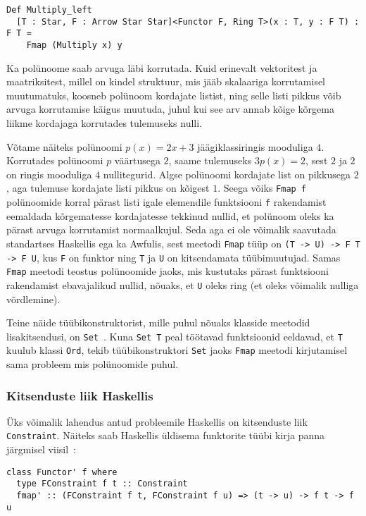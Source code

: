 \documentclass[12pt]{article}
\begin{document}
      \begin{verbatim}Def Multiply_left
  [T : Star, F : Arrow Star Star]<Functor F, Ring T>(x : T, y : F T) : F T =
    Fmap (Multiply x) y\end{verbatim}

      Ka polünoome saab arvuga läbi korrutada. Kuid erinevalt vektoritest ja maatriksitest, millel on kindel struktuur, mis jääb skalaariga korrutamisel muutumatuks, koosneb polünoom kordajate listist, ning selle listi pikkus võib arvuga korrutamise käigus muutuda, juhul kui see arv annab kõige kõrgema liikme kordajaga korrutades tulemuseks nulli.

      Võtame näiteks polünoomi $p(x)=2x+3$ jäägiklassiringis mooduliga $4$. Korrutades polünoomi $p$ väärtusega $2$, saame tulemuseks $3p(x)=2$, sest $2$ ja $2$ on ringis mooduliga $4$ nullitegurid. Algse polünoomi kordajate list on pikkusega $2$, aga tulemuse kordajate listi pikkus on kõigest $1$. Seega võiks \verb!Fmap f! polünoomide korral pärast listi igale elemendile funktsiooni \verb!f! rakendamist eemaldada kõrgematesse kordajatesse tekkinud nullid, et polünoom oleks ka pärast arvuga korrutamist normaalkujul. Seda aga ei ole võimalik saavutada standartses Haskellis ega ka Awfulis, sest meetodi \verb!Fmap! tüüp on \verb!(T -> U) -> F T -> F U!, kus \verb!F! on funktor ning \verb!T! ja \verb!U! on kitsendamata tüübimuutujad. Samas \verb!Fmap! meetodi teostus polünoomide jaoks, mis kustutaks pärast funktsiooni rakendamist ebavajalikud nullid, nõuaks, et \verb!U! oleks ring (et oleks võimalik nulliga võrdlemine).

      Teine näide tüübikonstruktorist, mille puhul nõuaks klasside meetodid lisakitsendusi, on \verb!Set!~\cite{Cat}. Kuna \verb!Set T! peal töötavad funktsioonid eeldavad, et \verb!T! kuulub klassi \verb!Ord!, tekib tüübikonstruktori \verb!Set! jaoks \verb!Fmap! meetodi kirjutamisel sama probleem mis polünoomide puhul.
      \subsubsection{Kitsenduste liik Haskellis}
        Üks võimalik lahendus antud probleemile Haskellis on kitsenduste liik \verb!Constraint!. Näiteks saab Haskellis üldisema funktorite tüübi kirja panna järgmisel viisil~\cite{Cat}:

        \begin{verbatim}class Functor' f where
  type FConstraint f t :: Constraint
  fmap' :: (FConstraint f t, FConstraint f u) => (t -> u) -> f t -> f u\end{verbatim}
\end{document}
